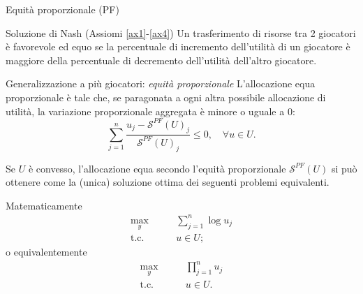 \documentclass{beamer}
\begin{document}
\begin{frame}{Equità proporzionale (PF)}
	\begin{block}{Soluzione di Nash (Assiomi \ref{ax1}-\ref{ax4})}
		Un trasferimento di risorse tra 2 giocatori è favorevole ed equo se la percentuale di incremento dell'utilità di un giocatore è maggiore della percentuale di decremento dell'utilità dell'altro giocatore.
	\end{block}
	\begin{block}{	Generalizzazione a più giocatori: \textit{equità proporzionale} }
		L'allocazione equa proporzionale è tale che, se paragonata a ogni altra possibile allocazione di utilità, la variazione proporzionale aggregata è minore o uguale a $0$:
		\vspace{-0.3cm}
		\begin{equation}
			\sum_{j=1}^n \frac{u_j - \mathcal{S}^{PF}(U)_j}{\mathcal{S}^{PF}(U)_j} \le 0, 	\quad \forall u \in U.
		\end{equation}
		\vspace{-0.5cm}
	\end{block}
\end{frame}

\begin{frame}
	Se $U$ è convesso, l'allocazione equa secondo l'equità proporzionale $\mathcal{S}^{PF}(U)$ si può ottenere come la (unica) soluzione ottima dei seguenti problemi equivalenti.
	\begin{block}{Matematicamente}
		\vspace{-0.6cm}
		\begin{equation}
			\begin{split}
				\underset{y}{\text{max}} & \qquad \sum_{j=1}^n \log{u_j} \\
				\text{t.c.} & \qquad u \in U;
			\end{split}
		\end{equation}
		o equivalentemente
		\vspace{-0.3cm}
		\begin{equation}
			\begin{split}
				\underset{y}{\text{max}} & \qquad \prod_{j=1}^n u_j \\
				\text{t.c.} & \qquad u \in U.
			\end{split}
		\end{equation}
		\vspace{-0.3cm}
	\end{block}
\end{frame}

\end{document}
